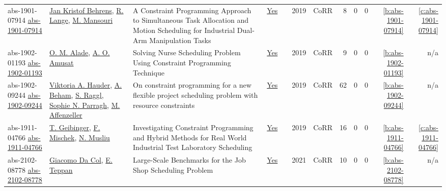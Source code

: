 {\begin{longtable}{>{\raggedright\arraybackslash}p{3cm}>{\raggedright\arraybackslash}p{6cm}>{\raggedright\arraybackslash}p{6.5cm}rrrp{2.5cm}rrrrr}
abs-1901-07914 \href{http://arxiv.org/abs/1901.07914}{abs-1901-07914} & \hyperref[auth:a543]{Jan Kristof Behrens}, \hyperref[auth:a544]{R. Lange}, \hyperref[auth:a545]{M. Mansouri} & A Constraint Programming Approach to Simultaneous Task Allocation and Motion Scheduling for Industrial Dual-Arm Manipulation Tasks & \href{../works/abs-1901-07914.pdf}{Yes} & \cite{abs-1901-07914} & 2019 & CoRR & 8 & 0 & 0 & \ref{b:abs-1901-07914} & \ref{c:abs-1901-07914}\\
abs-1902-01193 \href{http://arxiv.org/abs/1902.01193}{abs-1902-01193} & \hyperref[auth:a554]{O. M. Alade}, \hyperref[auth:a555]{A. O. Amusat} & Solving Nurse Scheduling Problem Using Constraint Programming Technique & \href{../works/abs-1902-01193.pdf}{Yes} & \cite{abs-1902-01193} & 2019 & CoRR & 9 & 0 & 0 & \ref{b:abs-1902-01193} & n/a\\
abs-1902-09244 \href{http://arxiv.org/abs/1902.09244}{abs-1902-09244} & \hyperref[auth:a556]{Viktoria A. Hauder}, \hyperref[auth:a557]{A. Beham}, \hyperref[auth:a558]{S. Raggl}, \hyperref[auth:a559]{Sophie N. Parragh}, \hyperref[auth:a560]{M. Affenzeller} & On constraint programming for a new flexible project scheduling problem with resource constraints & \href{../works/abs-1902-09244.pdf}{Yes} & \cite{abs-1902-09244} & 2019 & CoRR & 62 & 0 & 0 & \ref{b:abs-1902-09244} & n/a\\
abs-1911-04766 \href{http://arxiv.org/abs/1911.04766}{abs-1911-04766} & \hyperref[auth:a77]{T. Geibinger}, \hyperref[auth:a80]{F. Mischek}, \hyperref[auth:a45]{N. Musliu} & Investigating Constraint Programming and Hybrid Methods for Real World Industrial Test Laboratory Scheduling & \href{../works/abs-1911-04766.pdf}{Yes} & \cite{abs-1911-04766} & 2019 & CoRR & 16 & 0 & 0 & \ref{b:abs-1911-04766} & \ref{c:abs-1911-04766}\\
abs-2102-08778 \href{https://arxiv.org/abs/2102.08778}{abs-2102-08778} & \hyperref[auth:a93]{Giacomo Da Col}, \hyperref[auth:a614]{E. Teppan} & Large-Scale Benchmarks for the Job Shop Scheduling Problem & \href{../works/abs-2102-08778.pdf}{Yes} & \cite{abs-2102-08778} & 2021 & CoRR & 10 & 0 & 0 & \ref{b:abs-2102-08778} & n/a\\
\end{longtable}
}

